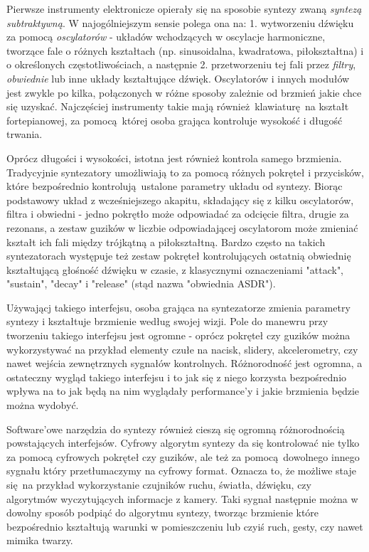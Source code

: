 \documentclass[magisterska]{pracamgr}
\begin{document}
Pierwsze instrumenty elektronicze opierały się na sposobie syntezy zwaną \textit{syntezą subtraktywną}. W najogólniejszym sensie polega ona na:
1. wytworzeniu dźwięku za pomocą \textit{oscylatorów} - układów wchodzących w oscylacje harmoniczne, tworzące fale o różnych kształtach (np. sinusoidalna, kwadratowa, piłokształtna) i o określonych częstotliwościach, a następnie
2. przetworzeniu tej fali przez \textit{filtry}, \textit{obwiednie} lub inne układy kształtujące dźwięk.
Oscylatorów i innych modułów jest zwykle po kilka, połączonych w różne sposoby zależnie od brzmień jakie chce się uzyskać. Najczęściej instrumenty takie mają również klawiaturę na kształt fortepianowej, za pomocą której osoba grająca kontroluje wysokość i długość trwania.

Oprócz długości i wysokości, istotna jest również kontrola samego brzmienia. Tradycyjnie syntezatory umożliwiają to za pomocą różnych pokręteł i przycisków, które bezpośrednio kontrolują ustalone parametry układu od syntezy. Biorąc podstawowy układ z wcześniejszego akapitu, składający się z kilku oscylatorów, filtra i obwiedni - jedno pokrętło może odpowiadać za odcięcie filtra, drugie za rezonans, a zestaw guzików w liczbie odpowiadającej oscylatorom może zmieniać kształt ich fali między trójkątną a piłokształtną. Bardzo często na takich syntezatorach występuje też zestaw pokręteł kontrolujących ostatnią obwiednię kształtującą głośność dźwięku w czasie, z klasycznymi oznaczeniami "attack", "sustain", "decay" i "release" (stąd nazwa "obwiednia ASDR").

Używającj takiego interfejsu, osoba grająca na syntezatorze zmienia parametry syntezy i kształtuje brzmienie według swojej wizji. Pole do manewru przy tworzeniu takiego interfejsu jest ogromne - oprócz pokręteł czy guzików można wykorzystywać na przykład elementy czułe na nacisk, slidery, akcelerometry, czy nawet wejścia zewnętrznych sygnałów kontrolnych. Różnorodność jest ogromna, a ostateczny wygląd takiego interfejsu i to jak się z niego korzysta bezpośrednio wpływa na to jak będą na nim wyglądały performance'y i jakie brzmienia będzie można wydobyć.

Software'owe narzędzia do syntezy również cieszą się ogromną różnorodnością powstających interfejsów. Cyfrowy algorytm syntezy da się kontrolować nie tylko za pomocą cyfrowych pokręteł czy guzików, ale też za pomocą dowolnego innego sygnału który przetłumaczymy na cyfrowy format. Oznacza to, że możliwe staje się na przykład wykorzystanie czujników ruchu, światła, dźwięku, czy algorytmów wyczytujących informacje z kamery. Taki sygnał następnie można w dowolny sposób podpiąć do algorytmu syntezy, tworząc brzmienie które bezpośrednio kształtują warunki w pomieszczeniu lub czyiś ruch, gesty, czy nawet mimika twarzy.
\end{document}
